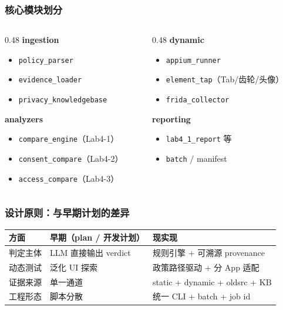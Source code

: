 \documentclass[AutoFakeBold,AutoFakeSlant]{beamer}
\begin{document}
\begin{frame}
    \frametitle{核心模块划分}
    \small
    \begin{columns}[T]
        \begin{column}{0.48\textwidth}
            \textbf{ingestion}
            \begin{itemize}
                \item \texttt{policy\_parser}
                \item \texttt{evidence\_loader}
                \item \texttt{privacy\_knowledgebase}
            \end{itemize}
            \textbf{analyzers}
            \begin{itemize}
                \item \texttt{compare\_engine}（Lab4-1）
                \item \texttt{consent\_compare}（Lab4-2）
                \item \texttt{access\_compare}（Lab4-3）
            \end{itemize}
        \end{column}
        \begin{column}{0.48\textwidth}
            \textbf{dynamic}
            \begin{itemize}
                \item \texttt{appium\_runner}
                \item \texttt{element\_tap}（Tab/齿轮/头像）
                \item \texttt{frida\_collector}
            \end{itemize}
            \textbf{reporting}
            \begin{itemize}
                \item \texttt{lab4\_1\_report} 等
                \item \texttt{batch} / manifest
            \end{itemize}
        \end{column}
    \end{columns}
\end{frame}

\begin{frame}
    \frametitle{设计原则：与早期计划的差异}
    \small
    \begin{tabularx}{\textwidth}{|l|X|X|}
        \hline
        \textbf{方面} & \textbf{早期（plan / 开发计划）} & \textbf{现实现} \\
        \hline
        判定主体 & LLM 直接输出 verdict & 规则引擎 + 可溯源 provenance \\
        \hline
        动态测试 & 泛化 UI 探索 & 政策路径驱动 + 分 App 适配 \\
        \hline
        证据来源 & 单一通道 & static + dynamic + oldsrc + KB \\
        \hline
        工程形态 & 脚本分散 & 统一 CLI + batch + job id \\
        \hline
    \end{tabularx}
\end{frame}
\end{document}
